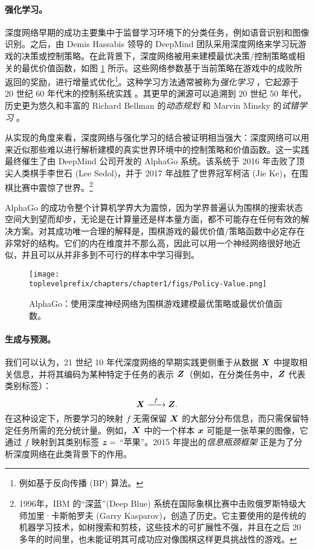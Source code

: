 \documentclass[../../book-main_zh.tex]{subfiles}
\begin{document}
\paragraph{强化学习。}

深度网络早期的成功主要集中于监督学习环境下的分类任务，例如语音识别和图像识别。之后，由 Demis Hassabis 领导的 DeepMind 团队采用深度网络来学习玩游戏的决策或控制策略。在此背景下，深度网络被用来建模最优决策/控制策略或相关的最优价值函数，如图 \ref{fig:Alpha-Go} 所示。这些网络参数基于当前策略在游戏中的成败所返回的奖励，进行增量式优化\footnote{例如基于反向传播 (BP) 算法。}。这种学习方法通常被称为{\em 强化学习} \cite{Sutton-Barto}，它起源于 20 世纪 60 年代末的控制系统实践 \cite{Waltz1965AHA,Mendel1970ReinforcementlearningCA}。其更早的渊源可以追溯到 20 世纪 50 年代，历史更为悠久和丰富的 Richard Bellman 的{\em 动态规划} \cite{Bellman-DP} 和 Marvin Minsky 的{\em 试错学习} \cite{Minsky-1954}。

从实现的角度来看，深度网络与强化学习的结合被证明相当强大：深度网络可以用来近似那些难以进行解析建模的真实世界环境中的控制策略和价值函数。这一实践最终催生了由 DeepMind 公司开发的 AlphaGo 系统。该系统于 2016 年击败了顶尖人类棋手李世石 (Lee Sedol)，并于 2017 年战胜了世界冠军柯洁 (Jie Ke)，在围棋比赛中震惊了世界。\footnote{1996年，IBM 的“深蓝”(Deep Blue) 系统在国际象棋比赛中击败俄罗斯特级大师加里·卡斯帕罗夫 (Garry Kasparov)，创造了历史。它主要使用的是传统的机器学习技术，如树搜索和剪枝，这些技术的可扩展性不强，并且在之后 20 多年的时间里，也未能证明其可成功应对像围棋这样更具挑战性的游戏。}

AlphaGo 的成功令整个计算机学界大为震惊，因为学界普遍认为围棋的搜索状态空间大到望而却步，无论是在计算量还是样本量方面，都不可能存在任何有效的解决方案。对其成功唯一合理的解释是，围棋游戏的最优价值/策略函数中必定存在非常好的结构。它们的内在维度并不那么高，因此可以用一个神经网络很好地近似，并且可以从并非多到不可行的样本中学习得到。

\begin{figure}
    \centering
    \texttt{[image: \\toplevelprefix/chapters/chapter1/figs/Policy-Value.png]}
    \caption{AlphaGo：使用深度神经网络为围棋游戏建模最优策略或最优价值函数。}
    \label{fig:Alpha-Go}
\end{figure}

\paragraph{生成与预测。}
我们可以认为，21 世纪 10 年代深度网络的早期实践更侧重于从数据 $\bm{X}$ 中提取相关信息，并将其编码为某种特定于任务的表示 $\bm{Z}$（例如，在分类任务中，$\bm{Z}$ 代表类别标签）：
\begin{equation}
    \bm{X}   \xrightarrow{\hspace{2mm} f \hspace{2mm}} \bm{Z}.
       \label{eqn:encoding-deep-networks}
\end{equation}
在这种设定下，所要学习的映射 $f$ 无需保留 $\bm{X}$ 的大部分分布信息，而只需保留特定任务所需的充分统计量。例如，$\bm{X}$ 中的一个样本 $\bm{x}$ 可能是一张苹果的图像，它通过 $f$ 映射到其类别标签 $\bm{z} =$ “苹果”。2015 年提出的{\em 信息瓶颈框架} \cite{Tishby-ITW2015} 正是为了分析深度网络在此类背景下的作用。
 
\end{document}
